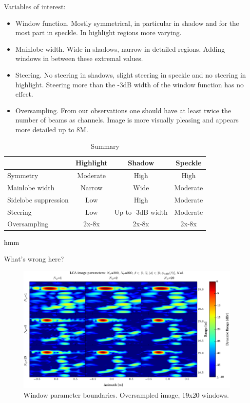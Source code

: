 \documentclass[10pt,journal,draftclsnofoot,onecolumn]{IEEEtran}
\let\MYoriglatexcaption\caption               %
\renewcommand{\caption}[2][\relax]{\MYoriglatexcaption[#2]{#2}}
\newcommand\1{\vec 1}
\begin{document}
Variables of interest:

\begin{itemize}
\item Window function. Mostly symmetrical, in particular in shadow and for the most part in speckle. In highlight regions more varying.
\item Mainlobe width. Wide in shadows, narrow in detailed regions. Adding windows in between these extremal values.
\item Steering. No steering in shadows, slight steering in speckle and no steering in highlight. Steering more than the -3dB width of the window function has no effect.
\item Oversampling. From our observations one should have at least twice the number of beams as channels. Image is more visually pleasing and appears more detailed up to 8M.
\end{itemize}
\begin{table}[!b]\centering%
\begin{tabular}[c]{l c c c}\hline
\rowcolor{tabBlue} & \bf Highlight & \bf Shadow & \bf Speckle  \\\hline
Symmetry             & Moderate  & High   & High \\
Mainlobe width       & Narrow    & Wide   & Moderate \\
Sidelobe suppression & Low       & High   & Moderate \\
Steering             & Low       & Up to -3dB width & Moderate \\
Oversampling         & 2x-8x     & 2x-8x  & 2x-8x
\end{tabular}
\caption{Summary}\label{tab:summary}
\end{table}%


\newpage


hmm 

\newpage

What's wrong here? 

\begin{figure}[tbhp!]%
\includegraphics[width=\textwidth]{gfx/oversampling_mosaic.pdf}%
\caption{Window parameter boundaries. Oversampled image, 19x20 windows.}\label{oversampling_mosaic}
\end{figure}
\end{document}

